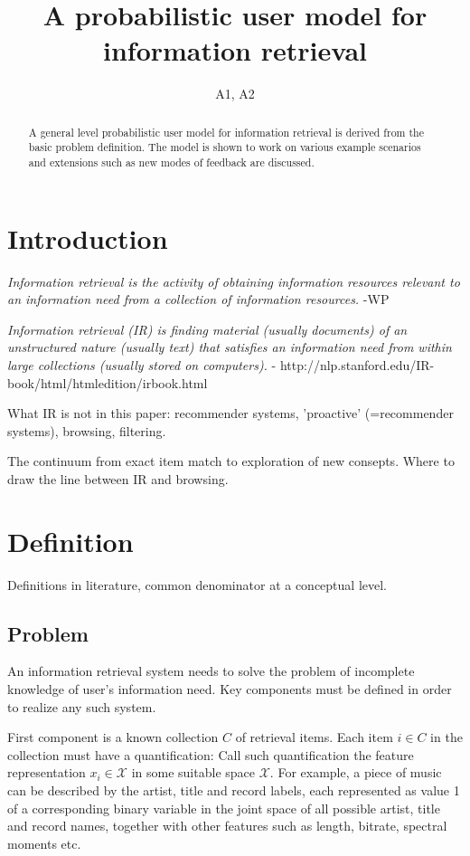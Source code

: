 \documentclass[10pt]{tufte-handout}
\title{A probabilistic user model for information retrieval}
\author{A1, A2}
\date{}
\begin{document}
\maketitle
\begin{abstract}
 A general level probabilistic user model for information retrieval is derived from the basic problem definition. The model is shown to work on various example scenarios and extensions such as new modes of feedback are discussed.
\end{abstract}

\section{Introduction}
{\it Information retrieval is the activity of obtaining information resources relevant to an information need from a collection of information resources.} -WP

{\it Information retrieval (IR) is finding material (usually documents) of an unstructured nature (usually text) that satisfies an information need from within large collections (usually stored on computers).} - http://nlp.stanford.edu/IR-book/html/htmledition/irbook.html

What IR is not in this paper: recommender systems, 'proactive' (=recommender systems), browsing, filtering.

The continuum from exact item match to exploration of new consepts. Where to draw the line between IR and browsing.



\section{Definition}

Definitions in literature, common denominator at a conceptual level.

\subsection{Problem}
An information retrieval system needs to solve the problem of incomplete knowledge of user's information need. Key components must be defined in order to realize any such system.

First component is a known collection $C$ of retrieval items. Each item $i \in C$ in the collection must have a quantification: Call such quantification the feature representation $x_i\in \mathcal X$ in some suitable space $\mathcal X$. For example, a piece of music can be described by the artist, title and record labels, each represented as value 1 of a corresponding binary variable in the joint space of all possible artist, title and record names, together with other features such as length, bitrate, spectral moments etc.
\end{document}
